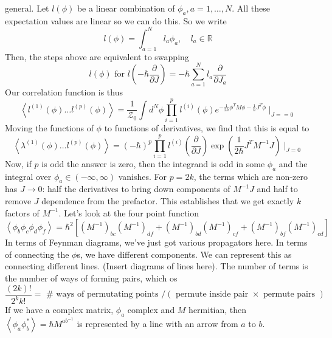 \documentclass[11pt, oneside]{article}   	%
\theoremstyle{slanted}
\begin{document}
general. 
Let $ l ( \phi ) $ be a linear combination 
of $ \phi _ a , a = 1, \dots, N $. 
All these expectation values are linear so we can do 
this. 
So we write 
\[
 l \left(  \phi   \right)   = \int_{ a = 1 } ^ N l _ a \phi _ a , \quad 
 l _ a \in \mathbb{ R } 
\]  Then, the steps above 
are equivalent 
to swapping 
\[
	l \left( \phi  \right)  \text{ for } l \left( 
	 - \hbar \frac{\partial  }{\partial  J } \right)  
	  = - \hbar \sum_{ a = 1 }^ N l _ a \frac{\partial }{\partial J_ a } 
\] Our correlation function 
is thus 
\[
	\left< l ^{ \left( 1  \right)  } \left( \phi  \right)  \dots 
	l ^{ \left( p \right) } \left( \phi  \right)  \right>
	 = \frac{1}{\mathcal{ Z } _ 0 } \int d ^ N \phi 
	 \prod_{ i =  1} ^ p l ^{ \left( i  \right)  } \left( \phi  \right) 
	 e ^{  - \frac{1}{ 2 \hbar } \phi ^ T M \phi  - \frac{1}{\hbar } J ^ T \phi } \mid_{ J =  = 0 }
\] Moving the functions of $ \phi $ to functions 
of derivatives, 
we find that this is equal to 
\[
	\left< \lambda ^{ \left( 1  \right)  } \left( \phi  \right)  
	\dots l ^{\left( p  \right)  }\left( \phi  \right)  \right>  
	 = \left(  - \hbar  \right)  ^ p 
	 \prod _{ i = 1 } ^ p l ^{ \left( i  \right)  } 
	 \left( \frac{\partial  }{\partial  J }   \right)  \exp \left( 
	 \frac{1}{  2 \hbar} J ^{ T } M ^{ - 1 } J \right) \mid_{ J = 0 } 
\]  
Now, if $ p$  is odd the answer is zero, 
then the integrand is odd in some $ \phi _a $ 
and the integral over $ \phi _ a \in \left(  - \infty , \infty  \right)  $ 
vanishes. 
For $ p = 2k $, the terms which are 
non-zero has $ J \to 0 $: half the derivatives to bring down 
components of $ M ^{ - 1} J $ and half to remove 
$ J $ dependence from the prefactor. 
This establishes that we get exactly $ k $ factors of $ M ^{ - 1 } $. 
Let's look at the four point function 
\[
\left< \phi _ b \phi _ c \phi _ d \phi _ f  \right>  = 
\hbar ^ 2 \left[  \left( M ^{  - 1}  \right) _{ b c } \left( M ^{ - 1 }  \right)  
_{ 
df } + \left( M ^{ - 1 } \right) _{ bd } \left( M ^{ - 1}  \right) _{ cf } 
+ \left( M ^{ - 1}  \right) _{ bf } \left( M ^{ - 1 }  \right)_{ cd }\right] 
\] In terms 
of Feynman diagrams, we've just got various propagators 
here. In terms of connecting the $ \phi $s, 
we have different components. 
We can represent this as connecting different lines. 
(Insert diagrams of lines here). 
The number of terms is the number of 
ways of forming pairs, which os 
\[
	\frac{\left(  2k  \right)  ! }{ 2 ^ k k ! }  = \text{ # ways of permutating points }
	/ ( \text{ permute inside pair }  \times \text{ permute pairs } ) 
\]  If we have a complex matrix, 
$ \phi _ a $ complex and $ M $ hermitian, 
then $ \left< \phi _ a \phi _ b ^ *  \right>  =  \hbar M ^{ab  }^{ - 1 } $ 
is represented by a line with an arrow from $ a $ to $ b $. 
 
\end{document}
